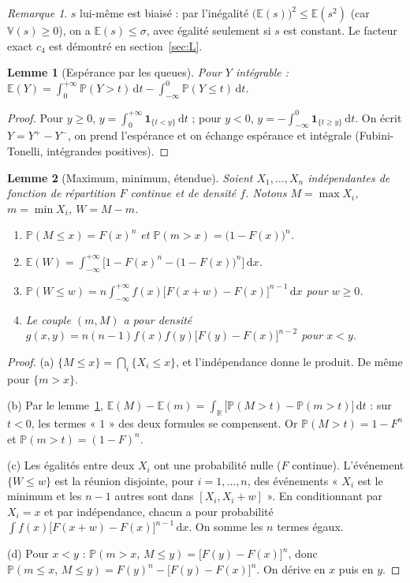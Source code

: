 \documentclass[11pt,a4paper]{article}
\theoremstyle{tq}
\newtheorem{lem}{Lemme}
\theoremstyle{remark}
\newtheorem*{rem}{Remarque}
\newcommand{\E}{\mathbb{E}}
\newcommand{\V}{\mathbb{V}}
\renewcommand{\P}{\mathbb{P}}
\newcommand{\R}{\mathbb{R}}
\newcommand{\dd}{\,\mathrm{d}}
\begin{document}
\begin{rem}
$s$ lui-même est biaisé : par l'inégalité $\big(\E(s)\big)^2\le\E(s^2)$ (car $\V(s)\ge0$), on a $\E(s)\le\sigma$, avec égalité seulement si $s$ est constant. Le facteur exact $c_4$ est démontré en section~\ref{sec:L}.
\end{rem}

\begin{lem}[Espérance par les queues]\label{lem:queues}
Pour $Y$ intégrable : $\displaystyle\E(Y)=\int_0^{+\infty}\P(Y>t)\dd t-\int_{-\infty}^0\P(Y\le t)\dd t$.
\end{lem}
\begin{proof}
Pour $y\ge0$, $y=\int_0^{+\infty}\mathbf 1_{\{t<y\}}\dd t$ ; pour $y<0$, $y=-\int_{-\infty}^0\mathbf 1_{\{t\ge y\}}\dd t$. On écrit $Y=Y^+-Y^-$, on prend l'espérance et on échange espérance et intégrale (Fubini-Tonelli, intégrandes positives).
\end{proof}

\begin{lem}[Maximum, minimum, étendue]\label{lem:etendue}
Soient $X_1,\dots,X_n$ indépendantes de fonction de répartition $F$ continue et de densité $f$. Notons $M=\max X_i$, $m=\min X_i$, $W=M-m$.
\begin{enumerate}[nosep,label=(\alph*)]
\item $\P(M\le x)=F(x)^n$ et $\P(m>x)=\big(1-F(x)\big)^n$.
\item $\displaystyle\E(W)=\int_{-\infty}^{+\infty}\Big[1-F(x)^n-\big(1-F(x)\big)^n\Big]\dd x$.
\item $\displaystyle\P(W\le w)=n\int_{-\infty}^{+\infty}f(x)\big[F(x+w)-F(x)\big]^{n-1}\dd x$ pour $w\ge0$.
\item Le couple $(m,M)$ a pour densité $g(x,y)=n(n-1)f(x)f(y)\big[F(y)-F(x)\big]^{n-2}$ pour $x<y$.
\end{enumerate}
\end{lem}
\begin{proof}
(a) $\{M\le x\}=\bigcap_i\{X_i\le x\}$, et l'indépendance donne le produit. De même pour $\{m>x\}$.

(b) Par le lemme~\ref{lem:queues}, $\E(M)-\E(m)=\int_{\R}\big[\P(M>t)-\P(m>t)\big]\dd t$ : sur $t<0$, les termes « $1$ » des deux formules se compensent. Or $\P(M>t)=1-F^n$ et $\P(m>t)=(1-F)^n$.

(c) Les égalités entre deux $X_i$ ont une probabilité nulle ($F$ continue). L'événement $\{W\le w\}$ est la réunion disjointe, pour $i=1,\dots,n$, des événements « $X_i$ est le minimum et les $n-1$ autres sont dans $[X_i,X_i+w]$ ». En conditionnant par $X_i=x$ et par indépendance, chacun a pour probabilité $\int f(x)\big[F(x+w)-F(x)\big]^{n-1}\dd x$. On somme les $n$ termes égaux.

(d) Pour $x<y$ : $\P(m>x,\,M\le y)=\big[F(y)-F(x)\big]^n$, donc $\P(m\le x,\,M\le y)=F(y)^n-\big[F(y)-F(x)\big]^n$. On dérive en $x$ puis en $y$.
\end{proof}
\end{document}
